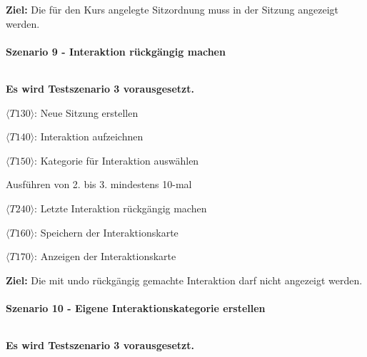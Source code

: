         \textbf{\sffamily Ziel:} Die für den Kurs angelegte Sitzordnung muss in der Sitzung angezeigt werden.

    \paragraph{Szenario 9 - Interaktion rückgängig machen} $~$ 

        \textbf{Es wird Testszenario 3 vorausgesetzt.}
        
        
        \begin{test9}
            \item $\langle T130 \rangle$: Neue Sitzung erstellen
            \item $\langle T140 \rangle$: Interaktion aufzeichnen
            \item $\langle T150 \rangle$: Kategorie für Interaktion auswählen
            \item Ausführen von 2. bis 3. mindestens 10-mal
            \item $\langle T240 \rangle$: Letzte Interaktion rückgängig machen
            \item $\langle T160 \rangle$: Speichern der Interaktionskarte
            \item $\langle T170 \rangle$: Anzeigen der Interaktionskarte
        \end{test9}
        
        \textbf{\sffamily Ziel:} Die mit \gls{undo} rückgängig gemachte Interaktion darf nicht angezeigt werden. 

    \newpage

    \paragraph{Szenario 10 - Eigene Interaktionskategorie erstellen} $~$ 

        \textbf{Es wird Testszenario 3 vorausgesetzt.}
        
        
